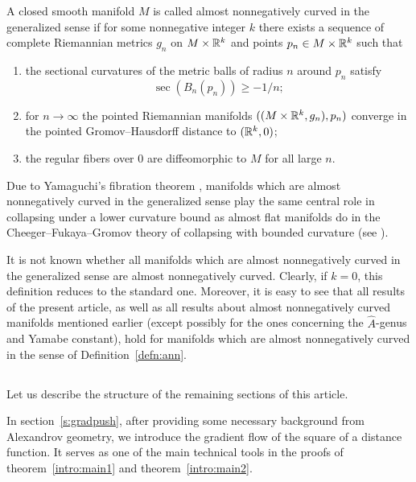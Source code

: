 \documentclass{amsart}
\begin{document}
\smallskip

 \begin{defn} \label{defn:ann}A closed smooth manifold $M$
is called almost nonnegatively curved in the generalized sense
if for some nonnegative integer $k$
there exists  a sequence of complete Riemannian metrics $g_n$ on
$M\times {\Bbb R}^k$
and points $p_n\in M\times {\Bbb R}^k$
such that
\begin{enumerate}
\item the sectional curvatures of the metric balls of radius $n$
around $p_n$ satisfy
$$\sec(B_n(p_n))\ge -1/n;$$
\item for $n\to\infty$
the pointed Riemannian manifolds $((M\times {\Bbb R}^k, g_n), p_n)$
converge in the pointed Gromov--Hausdorff distance to $({\Bbb R}^k,0)$;
\item
the regular fibers over $0$
are diffeomorphic to $M$ for all large $n$.
\end{enumerate}
\end{defn}

Due to Yamaguchi's fibration theorem \cite{Yam},
manifolds which are almost nonnegatively curved in the generalized sense
play the same central role in collapsing under a lower curvature bound
as almost flat manifolds do
in the Cheeger--Fukaya--Gromov theory
of collapsing with bounded curvature  (see \cite{CFG}).

It is not known whether
all manifolds which are
almost nonnegatively curved %
in the generalized sense
are almost nonnegatively curved.
Clearly, if $k=0$, this definition reduces to the standard one.
Moreover, it is easy to see that all results of the present article,
as well as all results about
almost nonnegatively curved manifolds mentioned earlier
(except possibly for the ones concerning %
the $\hat A$-genus and Yamabe constant),
hold for manifolds which are almost nonnegatively curved
in the sense of
Definition~\ref{defn:ann}.


\smallskip


\subsection{}
Let us describe the structure of the remaining sections of this article.


In section~\ref{s:gradpush}, after providing some necessary background
from Alexandrov geometry,
we introduce the gradient flow of the square of a distance function.
It serves as one of
the main technical tools in the proofs of  theorem~\ref{intro:main1}
and  theorem~\ref{intro:main2}.
\end{document}
